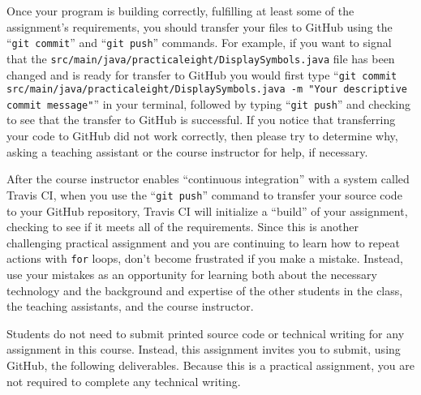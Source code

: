 \documentclass[11pt]{article}
\newcommand{\mainprogramsource}{\lstinline{src/main/java/practicaleight/DisplaySymbols.java}}
\newcommand{\gitcommit}{\command{git commit}}
\newcommand{\gitpush}{\command{git push}}
\newcommand{\gitcommitmainprogram}{\command{git commit src/main/java/practicaleight/DisplaySymbols.java -m "Your
descriptive commit message"}}
\newcommand{\command}[1]{``\lstinline{#1}''}
\newcommand{\program}[1]{\lstinline{#1}}
\newcommand{\step}[1]{``{#1}''}
\newcommand{\checkmark}{\ding{51}}
\newcommand{\naughtmark}{\ding{55}}
\begin{document}
Once your program is building correctly, fulfilling at least some of the assignment's requirements, you should transfer
your files to GitHub using the \gitcommit{} and \gitpush{} commands. For example, if you want to signal that the
\mainprogramsource{} file has been changed and is ready for transfer to GitHub you would first type
\gitcommitmainprogram{} in your terminal, followed by typing \gitpush{} and checking to see that the transfer to GitHub
is successful. If you notice that transferring your code to GitHub did not work correctly, then please try to determine
why, asking a teaching assistant or the course instructor for help, if necessary.


After the course instructor enables \step{continuous integration} with a system called Travis CI, when you use the
\gitpush{} command to transfer your source code to your GitHub repository, Travis CI will initialize a \step{build} of
your assignment, checking to see if it meets all of the requirements. Since this is another challenging practical
assignment and you are continuing to learn how to repeat actions with \program{for} loops, don't become frustrated if
you make a mistake. Instead, use your mistakes as an opportunity for learning both about the necessary technology and
the background and expertise of the other students in the class, the teaching assistants, and the course instructor.

Students do not need to submit printed source code or technical writing for any assignment in this course.
Instead, this assignment invites you to submit, using GitHub, the following deliverables. Because this is a practical
assignment, you are not required to complete any technical writing.
\end{document}
